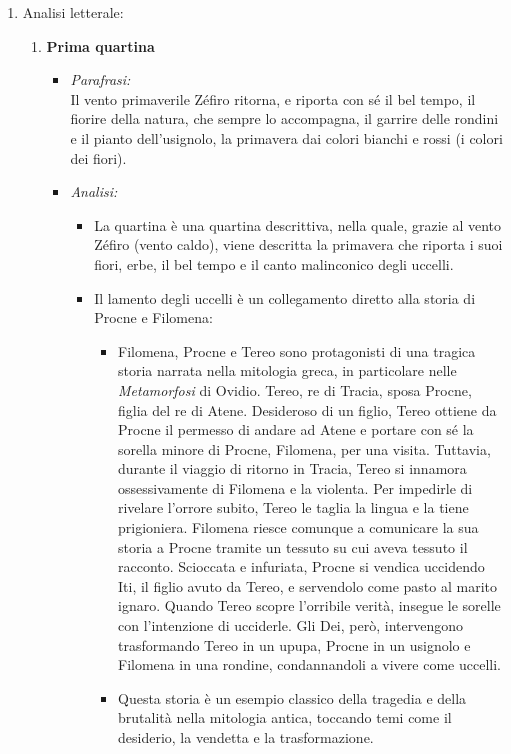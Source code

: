 \documentclass{article}
\begin{document}
\begin{enumerate}
    \item Analisi letterale:
        \begin{enumerate}[label=]
            \item \textbf{Prima quartina}
                \begin{itemize}[label=]
                    \item \textit{Parafrasi:}\\
                        Il vento primaverile Zéfiro ritorna, e riporta con sé il bel tempo, il fiorire della natura, che sempre lo accompagna, il garrire delle rondini e il pianto dell’usignolo, la primavera dai colori bianchi e rossi (i colori dei fiori).
                    \item \textit{Analisi:}
                        \begin{itemize}
                            \item La quartina è una quartina descrittiva, nella quale, grazie al vento Zéfiro (vento caldo), viene descritta la primavera che riporta i suoi fiori, erbe, il bel tempo e il canto malinconico degli uccelli.
                            \item Il lamento degli uccelli è un collegamento diretto alla storia di Procne e Filomena:
                                \begin{itemize}
                                    \item Filomena, Procne e Tereo sono protagonisti di una tragica storia narrata nella mitologia greca, in particolare nelle \textit{Metamorfosi} di Ovidio.
                                        Tereo, re di Tracia, sposa Procne, figlia del re di Atene. Desideroso di un figlio, Tereo ottiene da Procne il permesso di andare ad Atene e portare con sé la sorella minore di Procne, Filomena, per una visita. Tuttavia, durante il viaggio di ritorno in Tracia, Tereo si innamora ossessivamente di Filomena e la violenta.
                                        Per impedirle di rivelare l'orrore subito, Tereo le taglia la lingua e la tiene prigioniera. Filomena riesce comunque a comunicare la sua storia a Procne tramite un tessuto su cui aveva tessuto il racconto. Scioccata e infuriata, Procne si vendica uccidendo Iti, il figlio avuto da Tereo, e servendolo come pasto al marito ignaro. Quando Tereo scopre l'orribile verità, insegue le sorelle con l'intenzione di ucciderle. Gli Dei, però, intervengono trasformando Tereo in un upupa, Procne in un usignolo e Filomena in una rondine, condannandoli a vivere come uccelli.
                                    \item Questa storia è un esempio classico della tragedia e della brutalità nella mitologia antica, toccando temi come il desiderio, la vendetta e la trasformazione.

\end{itemize}
\end{itemize}
\end{itemize}
\end{enumerate}
\end{enumerate}
\end{document}
